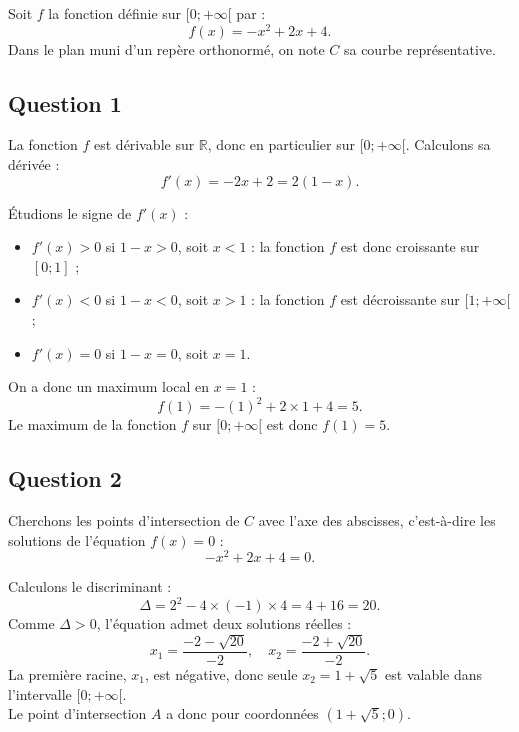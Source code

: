 Soit $f$ la fonction définie sur $[0 ; +\infty[$ par :
	\[
	f(x) = -x^2 + 2x + 4.
	\]
	Dans le plan muni d'un repère orthonormé, on note $C$ sa courbe représentative.
	
	\subsection*{Question 1}
	
	La fonction $f$ est dérivable sur $\mathbb{R}$, donc en particulier sur $[0 ; +\infty[$. Calculons sa dérivée :
	\[
	f'(x) = -2x + 2 = 2(1 - x).
	\]
	
	Étudions le signe de $f'(x)$ :
	\begin{itemize}
		\item $f'(x) > 0$ si $1 - x > 0$, soit $x < 1$ : la fonction $f$ est donc croissante sur $[0 ; 1]$ ;
		\item $f'(x) < 0$ si $1 - x < 0$, soit $x > 1$ : la fonction $f$ est décroissante sur $[1 ; +\infty[$ ;
		\item $f'(x) = 0$ si $1 - x = 0$, soit $x = 1$.
	\end{itemize}
	\begin{center}
	\end{center}
	On a donc un maximum local en $x = 1$ :
	\[
	f(1) = -(1)^2 + 2 \times 1 + 4 = 5.
	\]
	Le maximum de la fonction $f$ sur $[0 ; +\infty[$ est donc $f(1) = 5$.
	
	\subsection*{Question 2}
	
	Cherchons les points d'intersection de $C$ avec l'axe des abscisses, c'est-à-dire les solutions de l'équation $f(x) = 0$ :
	\[
	-x^2 + 2x + 4 = 0.
	\]
	
	Calculons le discriminant :
	\[
	\Delta = 2^2 - 4 \times (-1) \times 4 = 4 + 16 = 20.
	\]
	Comme $\Delta > 0$, l'équation admet deux solutions réelles :
	\[
	x_1 = \frac{-2 - \sqrt{20}}{-2}, \quad x_2 = \frac{-2 + \sqrt{20}}{-2}.
	\]
	La première racine, $x_1$, est négative, donc seule $x_2 = 1 + \sqrt{5}$ est valable dans l'intervalle $[0 ; +\infty[$.\\
	Le point d'intersection $A$ a donc pour coordonnées $(1 + \sqrt{5} ; 0)$.
	
